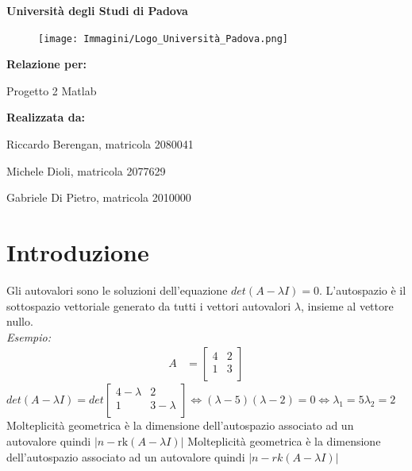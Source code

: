 \documentclass[12pt]{article}
\newcommand{\abs}[1]{\left|#1\right|}
\renewcommand{\familydefault}{\rmdefault} %
\begin{document}
\begin{titlepage}
    \centering
    {\Huge \textbf{Università degli Studi di Padova} \par}
    \vspace{1cm}
    \begin{figure}[h!]
        \centering
        \texttt{[image: Immagini/Logo\_Università\_Padova.png]}
    \end{figure}
    \vspace{1.5cm}
    {\LARGE \textbf{Relazione per:} \par}
    {\Huge Progetto 2 Matlab \par}
    \vfill
    \textbf{Realizzata da:} \par
    Riccardo Berengan, matricola 2080041 \par
    Michele Dioli, matricola 2077629 \par
    Gabriele Di Pietro, matricola 2010000 \par
    \vspace{0.5cm}
\end{titlepage}
    \renewcommand{\familydefault}{\sfdefault} %
    \fontsize{10}{12}\selectfont
    \newpage
    \section{Introduzione}
    Gli autovalori sono le soluzioni dell'equazione $det(A-\lambda I) = 0$. 
    L'autospazio è il sottospazio vettoriale generato da tutti i vettori autovalori $\lambda$, insieme al vettore nullo.\\ \textit{Esempio:}
    \begin{align*}
        A &= \begin{bmatrix}
            4 & 2 \\
            1 & 3 \\
        \end{bmatrix}
    \end{align*}
    $det(A-\lambda I) = det\begin{bmatrix}
        4-\lambda & 2 \\
        1 & 3-\lambda \\
    \end{bmatrix} \iff (\lambda - 5)(\lambda-2) = 0 \iff \lambda_1 = 5 \lambda_2 = 2$\\
    Molteplicità geometrica è la dimensione dell'autospazio associato ad un autovalore quindi $\abs{n - \text{rk}(A - \lambda I)}$
    Molteplicità geometrica è la dimensione dell'autospazio associato ad un autovalore quindi $|n - rk(A - \lambda I)|$
\end{document}
